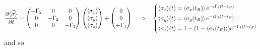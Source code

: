    \[
     \difffrac{\vec{\iaverage{\sigma}}}{t} = \begin{pmatrix}
       -\Gamma_2&0&0\\0&-\Gamma_2&0\\0&0&-\Gamma_1\\
     \end{pmatrix}\begin{pmatrix}
       \iaverage{\sigma_x}\\\iaverage{\sigma_y}\\\iaverage{\sigma_z}
     \end{pmatrix}+\begin{pmatrix} 0\\0\\+\Gamma_1
     \end{pmatrix}\iRa
     \ialigned{
       \isigmax(t) & = \iaverage{\sigma_x(t_R)}e^{-i\Gamma_{2}(t-t_R)}\\
       \isigmay(t) & = \iaverage{\sigma_y(t_R)}e^{-i\Gamma_{2}(t-t_R)}\\
       \isigmaz(t) & = 1 - (1-\iaverage{\sigma_z(t_R)})e^{-\Gamma_1(t-t_R)} }
   \]
   \noindent and so 
  
